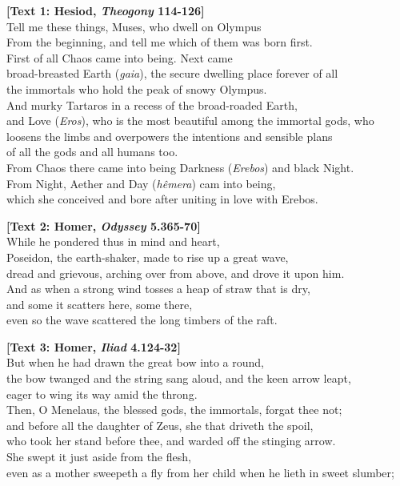 \documentclass[11pt]{article}
\begin{document}
\noindent \textbf{[Text 1: Hesiod, \emph{Theogony} 114-126]}\\Tell me these things, Muses, who dwell on Olympus\\From the beginning, and tell me which of them was born first.\\First of all Chaos came into being. Next came\\broad-breasted Earth (\emph{gaia}), the secure dwelling place forever of all\\the immortals who hold the peak of snowy Olympus.\\And murky Tartaros in a recess of the broad-roaded Earth,\\and Love (\emph{Eros}), who is the most beautiful among the immortal gods, who\\loosens the limbs and overpowers the intentions and sensible plans\\of all the gods and all humans too.\\From Chaos there came into being Darkness (\emph{Erebos}) and black Night.\\From Night, Aether and Day (\emph{h\^{e}mera}) cam into being,\\which she conceived and bore after uniting in love with Erebos.\\

\vspace*{1mm}

\noindent\textbf{[Text 2: Homer, \emph{Odyssey} 5.365-70]}\\While he pondered thus in mind and heart,\\Poseidon, the earth-shaker, made to rise up a great wave,\\dread and grievous, arching over from above, and drove it upon him.\\And as when a strong wind tosses a heap of straw that is dry, \\and some it scatters here, some there,\\even so the wave scattered the long timbers of the raft.\\

\vspace*{1mm}

\noindent\textbf{[Text 3: Homer, \emph{Iliad} 4.124-32]}\\But when he had drawn the great bow into a round,\\the bow twanged and the string sang aloud, and the keen arrow leapt,\\eager to wing its way amid the throng.\\Then, O Menelaus, the blessed gods, the immortals, forgat thee not;\\and before all the daughter of Zeus, she that driveth the spoil,\\who took her stand before thee, and warded off the stinging arrow.\\She swept it just aside from the flesh,\\even as a mother sweepeth a fly from her child when he lieth in sweet slumber;\\
\end{document}
